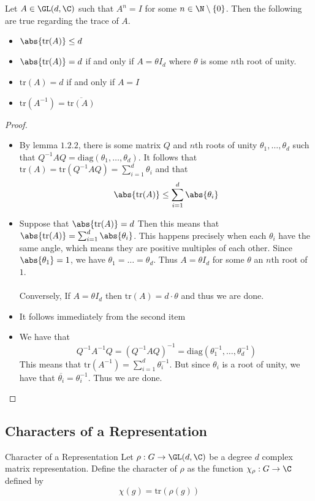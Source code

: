\documentclass[a4paper]{article}
\begin{document}
\begin{lmm}{}{} Let $A\in\GL(d,\C)$ such that $A^n=I$ for some $n\in\N\setminus\{0\}$. Then the following are true regarding the trace of $A$. 
\begin{itemize}
\item $\abs{\text{tr}(A)}\leq d$
\item $\abs{\text{tr}(A)}=d$ if and only if $A=\theta I_d$ where $\theta$ is some $n$th root of unity. 
\item $\text{tr}(A)=d$ if and only if $A=I$
\item $\text{tr}(A^{-1})=\overline{\text{tr}(A)}$
\end{itemize} \tcbline
\begin{proof}~\\
\begin{itemize}
\item By lemma $1.2.2$, there is some matrix $Q$ and $n$th roots of unity $\theta_1,\dots,\theta_d$ such that $Q^{-1}AQ=\text{diag}(\theta_1,\dots,\theta_d)$. It follows that $\text{tr}(A)=\text{tr}(Q^{-1}AQ)=\sum_{i=1}^d\theta_i$ and that $$\abs{\text{tr}(A)}\leq\sum_{i=1}^d\abs{\theta_i}$$
\item Suppose that $\abs{\text{tr}(A)}=d$ Then this means that $\abs{\text{tr}(A)}=\sum_{i=1}^d\abs{\theta_i}$. This happens precisely when each $\theta_i$ have the same angle, which means they are positive multiples of each other. Since $\abs{\theta_1}=1$, we have $\theta_1=\dots=\theta_d$. Thus $A=\theta I_d$ for some $\theta$ an $n$th root of $1$. \\~\\
Conversely, If $A=\theta I_d$ then $\text{tr}(A)=d\cdot\theta$ and thus we are done. 
\item It follows immediately from the second item
\item We have that $$Q^{-1}A^{-1}Q=(Q^{-1}AQ)^{-1}=\text{diag}(\theta_1^{-1},\dots,\theta_d^{-1})$$ This means that $\text{tr}(A^{-1})=\sum_{i=1}^d\theta_i^{-1}$. But since $\theta_i$ is a root of unity, we have that $\overline{\theta_i}=\theta_i^{-1}$. Thus we are done. 
\end{itemize}
\end{proof}
\end{lmm}

\subsection{Characters of a Representation}
\begin{defn}{Character of a Representation}{} Let $\rho:G\to\GL(d,\C)$ be a degree $d$ complex matrix representation. Define the character of $\rho$ as the function $\chi_\rho:G\to\C$ defined by $$\chi(g)=\text{tr}(\rho(g))$$
\end{defn}
\end{document}
